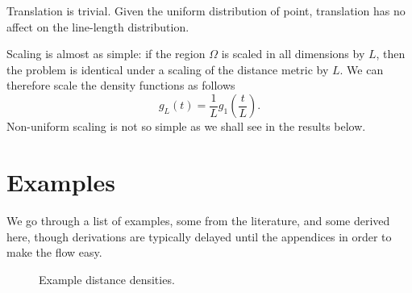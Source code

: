 \documentclass{article}
\begin{document}
Translation is trivial. Given the uniform distribution of point,
translation has no affect on the line-length distribution.

Scaling is almost as simple: if the region $\Omega$ is scaled in all
dimensions by $L$, then the problem is identical under a scaling of
the distance metric by $L$. We can therefore scale the density
functions as follows
\begin{equation}
   g_L(t) = \frac{1}{L} g_1 \left( \frac{t}{L} \right). 
\end{equation}
Non-uniform scaling is not so simple as we shall see in the results
below.


\section{Examples}
\label{sec:known}

We go through a list of examples, some from the literature, and some
derived here, though derivations are typically delayed until the
appendices in order to make the flow easy.

\begin{figure}[tbp]
  \begin{center}
    \caption{Example distance densities.}
  \end{center} 
\vspace{-4mm}
\end{figure}
\end{document}

